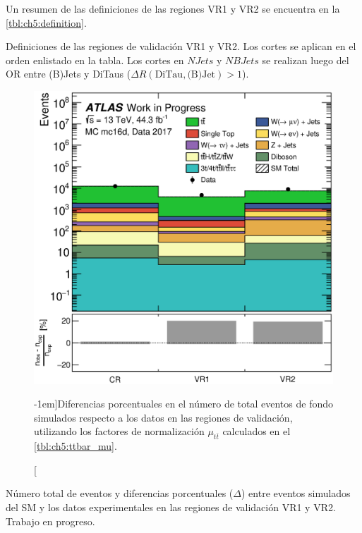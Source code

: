 Un resumen de las definiciones de las regiones VR1 y VR2 se encuentra en la \cref{tbl:ch5:definition}.

\begin{table}[b]
    \small
    \setlength{\tabcolsep}{1.2mm}
    
    \caption{Definiciones de las regiones de validación VR1 y VR2. Los cortes se aplican en el orden enlistado en la tabla. Los cortes en $NJets$ y $NBJets$ se realizan luego del OR entre (B)Jets y DiTaus ($\Delta R(\text{DiTau}, \text{(B)Jet}) > 1$).}
    \label{tbl:ch6:VRs_definition}
\end{table}



\begin{figure}[t]
    \hspace{2em}
    \includegraphics[width=0.75\linewidth]{Assets/Plots/h_mc16d_data17_delta.eps}
    \caption[][-1em]{Diferencias porcentuales en el número de total eventos de fondo simulados respecto a los datos en las regiones de validación, utilizando los factores de normalización $\mu_{t\bar{t}}$ calculados en el \cref{tbl:ch5:ttbar_mu}.}
    \label{fig:ch6:VRs_results}
\end{figure}

\begin{table}[t]
    \small
    
    \caption{Número total de eventos y diferencias porcentuales ($\Delta$) entre eventos simulados del SM y los datos experimentales en las regiones de validación VR1 y VR2. Trabajo en progreso.}
    \label{tbl:ch6:VRs_results}
\end{table}

